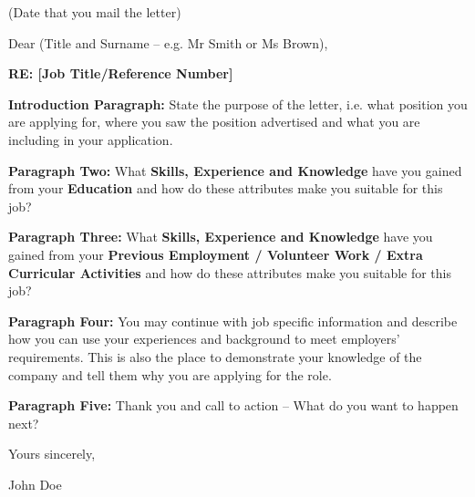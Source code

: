 \documentclass[11pt,a4paper]{article}
\newlength{\spacing}
\begin{document}
\vspace{\spacing} %
\noindent
(Date that you mail the letter)

\vspace{\spacing} %
\noindent
Dear (Title and Surname – e.g. Mr Smith or Ms Brown),

\vspace{\spacing} %
\begin{center}
    \textbf{RE: [Job Title/Reference Number]}
\end{center}

\vspace{\spacing} %
\noindent
\textbf{Introduction Paragraph:} State the purpose of the letter, i.e. what position you are applying for, where
you saw the position advertised and what you are including in your application.

\vspace{\spacing} %
\noindent
\textbf{Paragraph Two:} What \textbf{Skills, Experience and Knowledge} have you gained from your \textbf{Education} and
how do these attributes make you suitable for this job?

\vspace{\spacing}
\noindent
\textbf{Paragraph Three:} What \textbf{Skills, Experience and Knowledge} have you gained from your \textbf{Previous
Employment / Volunteer Work / Extra Curricular Activities} and how do these attributes make you
suitable for this job?

\vspace{\spacing}
\noindent
\textbf{Paragraph Four:} You may continue with job specific information and describe how you can use your
experiences and background to meet employers' requirements. This is also the place to demonstrate
your knowledge of the company and tell them why you are applying for the role.

\vspace{\spacing}
\noindent
\textbf{Paragraph Five:} Thank you and call to action – What do you want to happen next?

\vspace{\spacing} %
\noindent
Yours sincerely,

\vfill

\noindent
John Doe
\end{document}
